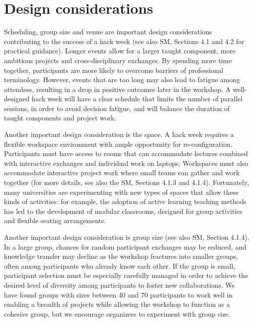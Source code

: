 \section*{Design considerations}

Scheduling, group size and venue are important design considerations contributing to the success of a hack week (see also SM, Sections 4.1 and 4.2 for practical guidance).
Longer events allow for a larger taught component, more ambitious projects and cross-disciplinary exchanges.
By spending more time together, participants are more likely to overcome barriers of professional terminology.
However, events that are too long may also lead to fatigue among attendees, resulting in a drop in positive outcomes later in the workshop.
A well-designed hack week will have a clear schedule that limits the number of parallel sessions, in order to avoid decision fatigue, and will balance the duration of taught components and project work.

Another important design consideration is the space. A hack week requires a flexible workspace environment with ample opportunity for re-configuration.
Participants must have access to rooms that can accommodate lectures combined with interactive exchanges and individual work on laptops.
Workspaces must also accommodate interactive project work where small teams can gather and work together (for more details, see also the SM, Sections 4.1.3 and 4.1.4).
Fortunately, many universities are experimenting with new types of spaces that allow these kinds of activities: for example, the adoption of active learning teaching methods \cite{prince2004} has led to the development of modular classrooms, designed for group activities and flexible seating arrangements.

Another important design consideration is group size (see also SM, Section 4.1.4).
In a large group, chances for random participant exchanges may be reduced, and knowledge transfer may decline as the workshop fractures into smaller groups, often among participants who already know each other.
If the group is small, participant selection must be especially carefully managed in order to achieve the desired level of diversity among participants to foster new collaborations.
We have found groups with sizes between 40 and 70 participants to work well in enabling a breadth of projects while allowing the workshop to function as a cohesive group, but we encourage organizers to experiment with group size.

